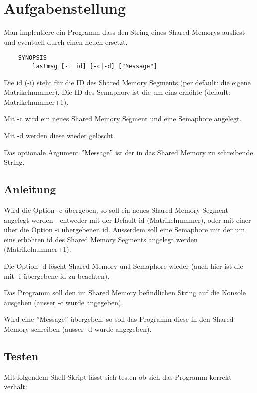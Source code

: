 




\section*{Aufgabenstellung}


Man implentiere ein Programm dass den String eines Shared Memorys ausliest und
eventuell durch einen neuen ersetzt.
\begin{verbatim}
    SYNOPSIS
        lastmsg [-i id] [-c|-d] ["Message"]
\end{verbatim}

Die id (-i) steht für die ID des Shared Memory Segments (per default: die eigene Matrikelnummer).
Die ID des Semaphore ist die um eins erhöhte (default: Matrikelnummer+1).

Mit -c wird ein neues Shared Memory Segment und eine Semaphore angelegt.

Mit -d werden diese wieder gelöscht.

Das optionale Argument ''Message'' ist der in das Shared Memory zu schreibende String.

\subsection*{Anleitung}

Wird die Option -c übergeben, so soll ein neues Shared Memory Segment angelegt
werden - entweder mit der Default id (Matrikelnummer), oder mit einer über die Option -i
übergebenen id. Ausserdem soll eine Semaphore mit der um eins erhöhten id des
Shared Memory Segments angelegt werden (Matrikelnummer+1).

Die Option -d löscht Shared Memory und Semaphore wieder (auch hier ist die mit
-i übergebene id zu beachten).

Das Programm soll den im Shared Memory befindlichen String auf die Konsole
ausgeben (ausser -c wurde angegeben).

Wird eine ''Message'' übergeben, so soll das Programm diese in den Shared
Memory schreiben (ausser -d wurde angegeben).

\subsection*{Testen}

Mit folgendem Shell-Skript lässt sich testen ob sich das Programm korrekt
verhält:

